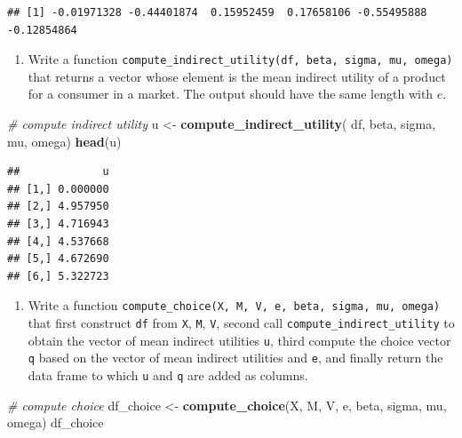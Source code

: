 \documentclass[]{book}
\newenvironment{Shaded}{\begin{snugshade}}{\end{snugshade}}
\newcommand{\KeywordTok}[1]{\textcolor[rgb]{0.13,0.29,0.53}{\textbf{#1}}}
\newcommand{\StringTok}[1]{\textcolor[rgb]{0.31,0.60,0.02}{#1}}
\newcommand{\CommentTok}[1]{\textcolor[rgb]{0.56,0.35,0.01}{\textit{#1}}}
\newcommand{\NormalTok}[1]{#1}
\providecommand{\tightlist}{%
  \setlength{\itemsep}{0pt}\setlength{\parskip}{0pt}}
\begin{document}
\begin{verbatim}
## [1] -0.01971328 -0.44401874  0.15952459  0.17658106 -0.55495888 -0.12854864
\end{verbatim}

\begin{enumerate}
\def\labelenumi{\arabic{enumi}.}
\setcounter{enumi}{6}
\tightlist
\item
  Write a function
  \texttt{compute\_indirect\_utility(df,\ beta,\ sigma,\ mu,\ omega)}
  that returns a vector whose element is the mean indirect utility of a
  product for a consumer in a market. The output should have the same
  length with \(e\).
\end{enumerate}

\begin{Shaded}
\begin{Highlighting}[]
\CommentTok{# compute indirect utility}
\NormalTok{u <-}\StringTok{ }
\StringTok{  }\KeywordTok{compute_indirect_utility}\NormalTok{(}
\NormalTok{    df, beta, sigma, }
\NormalTok{           mu, omega)}
\KeywordTok{head}\NormalTok{(u)}
\end{Highlighting}
\end{Shaded}

\begin{verbatim}
##             u
## [1,] 0.000000
## [2,] 4.957950
## [3,] 4.716943
## [4,] 4.537668
## [5,] 4.672690
## [6,] 5.322723
\end{verbatim}

\begin{enumerate}
\def\labelenumi{\arabic{enumi}.}
\setcounter{enumi}{7}
\tightlist
\item
  Write a function
  \texttt{compute\_choice(X,\ M,\ V,\ e,\ beta,\ sigma,\ mu,\ omega)}
  that first construct \texttt{df} from \texttt{X}, \texttt{M},
  \texttt{V}, second call \texttt{compute\_indirect\_utility} to obtain
  the vector of mean indirect utilities \texttt{u}, third compute the
  choice vector \texttt{q} based on the vector of mean indirect
  utilities and \texttt{e}, and finally return the data frame to which
  \texttt{u} and \texttt{q} are added as columns.
\end{enumerate}

\begin{Shaded}
\begin{Highlighting}[]
\CommentTok{# compute choice}
\NormalTok{df_choice <-}\StringTok{ }
\StringTok{  }\KeywordTok{compute_choice}\NormalTok{(X, M, V, e, beta, sigma, }
\NormalTok{                 mu, omega)}
\NormalTok{df_choice}
\end{Highlighting}
\end{Shaded}
\end{document}
